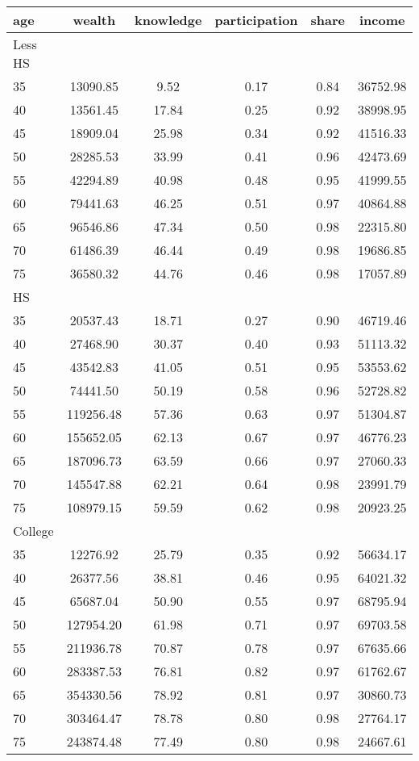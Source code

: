  \begin{tabular}{lccccc}
 \hline \hline
  age & wealth & knowledge & participation & share & income \\
 \hline
 Less HS & & & & & \\
 \hline
35 &  13090.85 &      9.52 &      0.17 &      0.84 &  36752.98 \\ 
40 &  13561.45 &     17.84 &      0.25 &      0.92 &  38998.95 \\ 
45 &  18909.04 &     25.98 &      0.34 &      0.92 &  41516.33 \\ 
50 &  28285.53 &     33.99 &      0.41 &      0.96 &  42473.69 \\ 
55 &  42294.89 &     40.98 &      0.48 &      0.95 &  41999.55 \\ 
60 &  79441.63 &     46.25 &      0.51 &      0.97 &  40864.88 \\ 
65 &  96546.86 &     47.34 &      0.50 &      0.98 &  22315.80 \\ 
70 &  61486.39 &     46.44 &      0.49 &      0.98 &  19686.85 \\ 
75 &  36580.32 &     44.76 &      0.46 &      0.98 &  17057.89 \\ 
 \hline
 HS & & & & & \\
 \hline
35 &  20537.43 &     18.71 &      0.27 &      0.90 &  46719.46 \\ 
40 &  27468.90 &     30.37 &      0.40 &      0.93 &  51113.32 \\ 
45 &  43542.83 &     41.05 &      0.51 &      0.95 &  53553.62 \\ 
50 &  74441.50 &     50.19 &      0.58 &      0.96 &  52728.82 \\ 
55 & 119256.48 &     57.36 &      0.63 &      0.97 &  51304.87 \\ 
60 & 155652.05 &     62.13 &      0.67 &      0.97 &  46776.23 \\ 
65 & 187096.73 &     63.59 &      0.66 &      0.97 &  27060.33 \\ 
70 & 145547.88 &     62.21 &      0.64 &      0.98 &  23991.79 \\ 
75 & 108979.15 &     59.59 &      0.62 &      0.98 &  20923.25 \\ 
 \hline
 College & & & & & \\
 \hline
35 &  12276.92 &     25.79 &      0.35 &      0.92 &  56634.17 \\ 
40 &  26377.56 &     38.81 &      0.46 &      0.95 &  64021.32 \\ 
45 &  65687.04 &     50.90 &      0.55 &      0.97 &  68795.94 \\ 
50 & 127954.20 &     61.98 &      0.71 &      0.97 &  69703.58 \\ 
55 & 211936.78 &     70.87 &      0.78 &      0.97 &  67635.66 \\ 
60 & 283387.53 &     76.81 &      0.82 &      0.97 &  61762.67 \\ 
65 & 354330.56 &     78.92 &      0.81 &      0.97 &  30860.73 \\ 
70 & 303464.47 &     78.78 &      0.80 &      0.98 &  27764.17 \\ 
75 & 243874.48 &     77.49 &      0.80 &      0.98 &  24667.61 \\ 
 \hline \hline
 \end{tabular}
